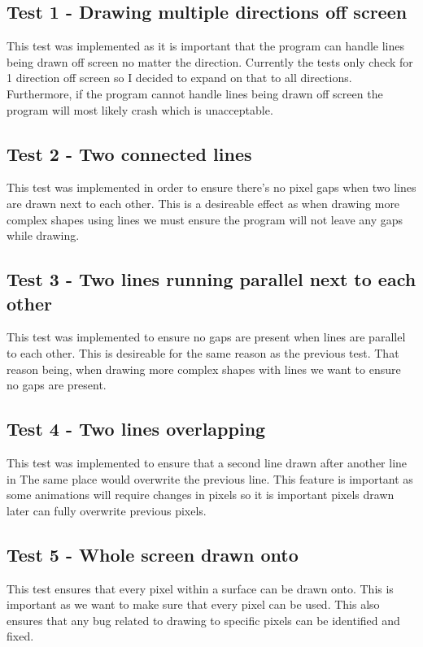 \documentclass[
	letterpaper, %
	10pt, %
]{CSUniSchoolLabReport}
\begin{document}
\subsection*{Test 1 {-} Drawing multiple directions off screen}
This test was implemented as it is important that the program can handle lines 
being drawn off screen no matter the direction. Currently the tests only check for 
1 direction off screen so I decided to expand on that to all directions. Furthermore, 
if the program cannot handle lines being drawn off screen the program will most likely
crash which is unacceptable.

\subsection*{Test 2 {-} Two connected lines}
This test was implemented in order to ensure there's no pixel gaps when two lines 
are drawn next to each other. This is a desireable effect as when drawing more 
complex shapes using lines we must ensure the program will not leave any gaps while
drawing.


\subsection*{Test 3 {-} Two lines running parallel next to each other}
This test was implemented to ensure no gaps are present when lines are parallel to each other.
This is desireable for the same reason as the previous test. That reason being, 
when drawing more complex shapes with lines we want to ensure no gaps are present.
\subsection*{Test 4 {-} Two lines overlapping}
This test was implemented to ensure that a second line drawn after another line in The
same place would overwrite the previous line. This feature is important as some animations
 will require changes in pixels so it is important pixels drawn later can fully overwrite
 previous pixels.
\subsection*{Test 5 {-} Whole screen drawn onto}
This test ensures that every pixel within a surface can be drawn onto. This is important
as we want to make sure that every pixel can be used. This also ensures that any bug 
related to drawing to specific pixels can be identified and fixed.
\end{document}
